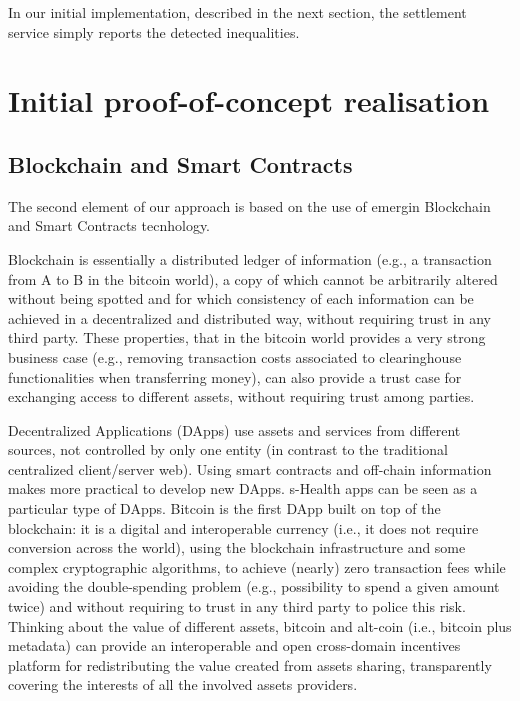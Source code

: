 \documentclass[conference]{IEEEtran}
\begin{document}
In our initial implementation, described in the next section, the settlement service simply reports the detected inequalities.

\section{Initial proof-of-concept realisation}  \label{eq:realisation}


\subsection{Blockchain and Smart Contracts}  \label{sec:blockchain}

The second element of our approach is based on the use of emergin Blockchain and Smart Contracts tecnhology.


Blockchain is essentially a distributed ledger of information (e.g., a transaction from A to B in the bitcoin world), a copy of which cannot be arbitrarily altered without being spotted and for which consistency of each information can be achieved in a decentralized and distributed way, without requiring trust in any third party. These properties, that in the bitcoin world provides a very strong business case (e.g., removing transaction costs associated to clearinghouse functionalities when transferring money), can also provide a trust case for exchanging access to different assets, without requiring trust among parties.

Decentralized Applications (DApps) use assets and services from different sources, not controlled by only one entity (in contrast to the traditional centralized client/server web). Using smart contracts and off-chain information makes more practical to develop new DApps. s-Health apps can be seen as a particular type of DApps. Bitcoin is the first DApp built on top of the blockchain: it is a digital and interoperable currency (i.e., it does not require conversion across the world), using the blockchain infrastructure and some complex cryptographic algorithms, to achieve (nearly) zero transaction fees while avoiding the double-spending problem (e.g., possibility to spend a given amount twice) and without requiring to trust in any third party to police this risk. Thinking about the value of different assets, bitcoin and alt-coin (i.e., bitcoin plus metadata) can provide an interoperable and open cross-domain incentives platform for redistributing the value created from assets sharing, transparently covering the interests of all the involved assets providers.
\end{document}
